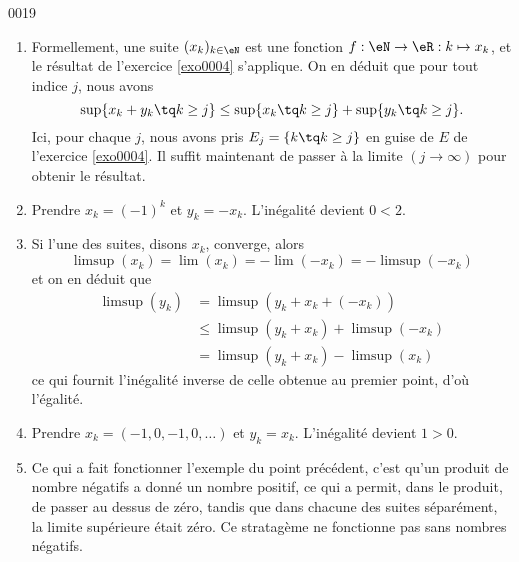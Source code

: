 
\begin{corrige}{0019}

\begin{enumerate}
\item Formellement, une suite $(x_k)_{k\in\eN}$ est une fonction $f : \eN \to \eR : k \mapsto x_k$, et le résultat de l'exercice \ref{exo0004} s'applique. On en déduit que pour tout indice $j$, nous avons
 \begin{equation*}
    \sup\{ x_k + y_k \tq k \geq j \} \leq   \sup\{ x_k \tq k \geq j \} +  \sup\{ y_k \tq k \geq j \}.
  \end{equation*}
Ici, pour chaque $j$, nous avons pris $E_j=\{ k\tq k\geq j \}$ en guise de $E$ de l'exercice \ref{exo0004}. Il suffit maintenant de passer à la limite $(j \to \infty)$ pour obtenir le résultat.
\item
Prendre $x_k = (-1)^k$ et $y_k = -x_k$. L'inégalité devient $0 <
  2$.

\item Si l'une des suites, disons $x_k$, converge, alors
  \begin{equation*}
    \limsup (x_k) = \lim (x_k) = - \lim(-x_k) = - \limsup (-x_k)
  \end{equation*}
  et on en déduit que
  \begin{equation*}
    \begin{split}
      \limsup (y_k) &= \limsup(y_k + x_k + (-x_k))\\
      &\leq \limsup(y_k + x_k) + \limsup (-x_k)\\
      &= \limsup(y_k + x_k) - \limsup (x_k)
    \end{split}
  \end{equation*}
  ce qui fournit l'inégalité inverse de celle obtenue au premier
  point, d'où l'égalité.

\item Prendre $x_k = (-1, 0, -1, 0, \ldots)$ et $y_k =
  x_k$. L'inégalité devient $1 > 0$.

\item 

Ce qui a fait fonctionner l'exemple du point précédent, c'est qu'un produit de nombre négatifs a donné un nombre positif, ce qui a permit, dans le produit,  de passer au dessus de zéro, tandis que dans chacune des suites séparément, la limite supérieure était zéro. Ce stratagème ne fonctionne pas sans nombres négatifs.


\end{enumerate}
\end{corrige}
